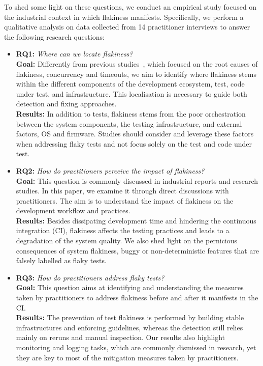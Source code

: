 To shed some light on these questions, we conduct an empirical study focused on the industrial context in which flakiness manifests. 
Specifically, we perform a qualitative analysis on data collected from 14 practitioner interviews to answer the following research questions:


\begin{itemize}[label={}]
\item \textbf{\textsc{RQ1:}} \emph{Where can we locate flakiness?}\\
    \textbf{Goal:} Differently from previous studies~\cite{Luo2014,Eck2019,Thorve2018,Dutta2020,Lam2019RootCausing}, which focused on the root causes of flakiness, \eg concurrency and timeouts, we aim to identify where flakiness stems within the different components of the development ecosystem, \eg test, code under test, and infrastructure. This localisation is necessary to guide both detection and fixing approaches.\\
    \textbf{Results:} In addition to tests, flakiness stems from the poor orchestration between the system components, the testing infrastructure, and external factors, \eg OS and firmware. Studies should consider and leverage these factors when addressing flaky tests and not focus solely on the test and code under test.
    
\item \textbf{\textsc{RQ2:}} \emph{How do practitioners perceive the impact of flakiness?}\\
    \textbf{Goal:} This question is commonly discussed in industrial reports and research studies. In this paper, 
    we examine it through direct discussions with practitioners. The aim is to understand the impact of flakiness on the development workflow and practices. \\
    \textbf{Results:} Besides dissipating development time and hindering the continuous integration (CI), flakiness affects the testing practices and leads to a degradation of the system quality. We also shed light on the pernicious consequences of system flakiness, \ie buggy or non-deterministic features that are falsely labelled as flaky tests.
    
\item \textbf{\textsc{RQ3:}} \emph{ How do practitioners address flaky tests?}\\
    \textbf{Goal:} This question aims at identifying and understanding the measures taken by practitioners to address flakiness before and after it manifests in the CI.\\
    \textbf{Results:}
    The prevention of test flakiness is performed by building stable infrastructures and enforcing guidelines, whereas the detection still relies mainly on reruns and manual inspection. Our results also highlight monitoring and logging tasks, which are commonly dismissed in research, yet they are key to most of the mitigation measures taken by practitioners.
    

\end{itemize}
